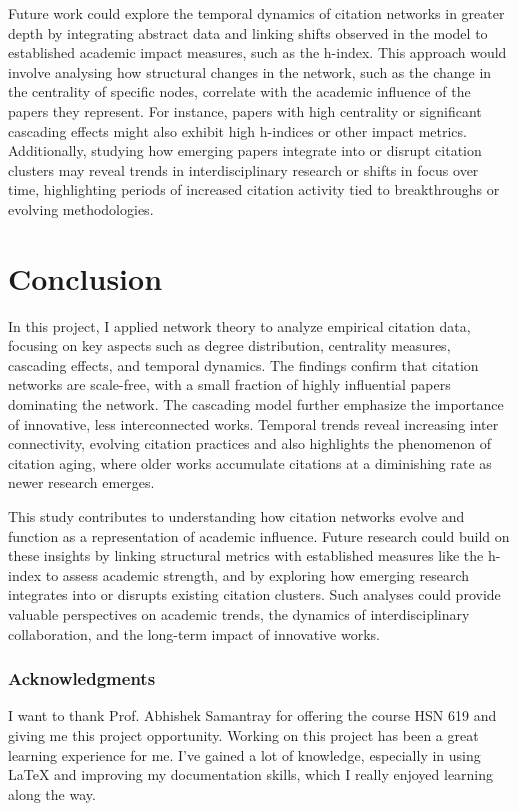 \documentclass{article}
\begin{document}
Future work could explore the temporal dynamics of citation networks in greater depth by integrating abstract data and linking shifts observed in the model to established academic impact measures, such as the h-index. This approach would involve analysing how structural changes in the network, such as the change in the centrality of specific nodes, correlate with the academic influence of the papers they represent. For instance, papers with high centrality or significant cascading effects might also exhibit high h-indices or other impact metrics. Additionally, studying how emerging papers integrate into or disrupt citation clusters may reveal trends in interdisciplinary research or shifts in focus over time, highlighting periods of increased citation activity tied to breakthroughs or evolving methodologies.


\section{Conclusion}
\label{headings}

In this project, I applied network theory to analyze empirical citation data, focusing on key aspects such as degree distribution, centrality measures, cascading effects, and temporal dynamics. The findings confirm that citation networks are scale-free, with a small fraction of highly influential papers dominating the network. The cascading model further emphasize the importance of innovative, less interconnected works. Temporal trends reveal increasing inter connectivity, evolving citation practices and also highlights the phenomenon of citation aging, where older works accumulate citations at a diminishing rate as newer research emerges.

This study contributes to understanding how citation networks evolve and function as a representation of academic influence. Future research could build on these insights by linking structural metrics with established measures like the h-index to assess academic strength, and by exploring how emerging research integrates into or disrupts existing citation clusters. Such analyses could provide valuable perspectives on academic trends, the dynamics of interdisciplinary collaboration, and the long-term impact of innovative works.

\subsubsection*{Acknowledgments}

I want to thank Prof. Abhishek Samantray for offering the course HSN 619 and giving me this project opportunity. Working on this project has been a great learning experience for me. I’ve gained a lot of knowledge, especially in using LaTeX and improving my documentation skills, which I really enjoyed learning along the way.
\end{document}
